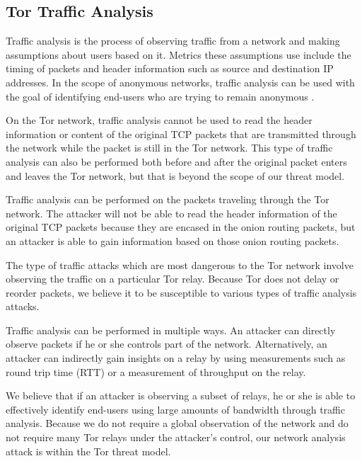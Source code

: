 \documentclass[12pt,journal]{IEEEtran}
\begin{document}
\subsection{Tor Traffic Analysis}
Traffic analysis is the process of observing traffic from a network and making assumptions about users based on it. Metrics these assumptions use include the timing of packets and header information such as source and destination IP addresses. In the scope of anonymous networks, traffic analysis can be used with the goal of identifying end-users who are trying to remain anonymous \cite{Murdoch:2005:LTA:1058433.1059390}.
\par
On the Tor network, traffic analysis cannot be used to read the header information or content of the original TCP packets that are transmitted through the network while the packet is still in the Tor network. This type of traffic analysis can also be performed both before and after the original packet enters and leaves the Tor network, but that is beyond the scope of our threat model.
\par
Traffic analysis can be performed on the packets traveling through the Tor network. The attacker will not be able to read the header information of the original TCP packets because they are encased in the onion routing packets, but an attacker is able to gain information based on those onion routing packets.
\par
The type of traffic attacks which are most dangerous to the Tor network involve observing the traffic on a particular Tor relay. Because Tor does not delay or reorder packets, we believe it to be susceptible to various types of traffic analysis attacks.
\par
Traffic analysis can be performed in multiple ways. An attacker can directly observe packets if he or she controls part of the network. Alternatively, an attacker can indirectly gain insights on a relay by using measurements such as round trip time (RTT) or a measurement of throughput on the relay.
\par
We believe that if an attacker is observing a subset of relays, he or she is able to effectively identify end-users using large amounts of bandwidth through traffic analysis. Because we do not require a global observation of the network and do not require many Tor relays under the attacker's control, our network analysis attack is within the Tor threat model.
\end{document}
